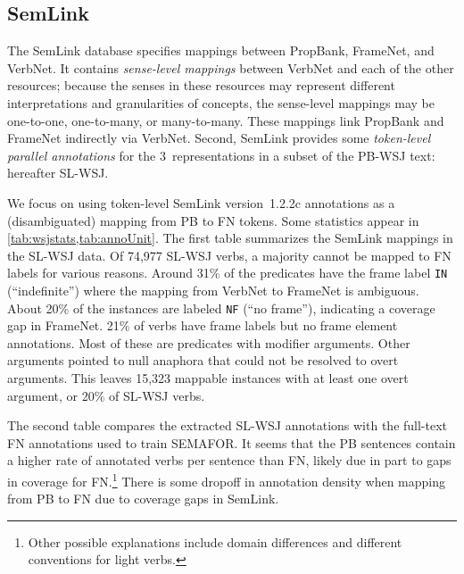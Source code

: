 \documentclass[11pt]{article}
\newcommand{\ensuretext}[1]{#1}
\newcommand{\nssmarker}{\ensuretext{\textcolor{magenta}{\ensuremath{^{\textsc{NS}}_{\textsc{S}}}}}}
\newcommand{\arkcomment}[3]{\ensuretext{\textcolor{#3}{[#1 #2]}}}
\newcommand{\nss}[1]{\arkcomment{\nssmarker}{#1}{magenta}}
\newcommand{\finalversion}[1]{}
\begin{document}
\subsection{SemLink}\label{sec:semlink}

The SemLink database \citep{semlink} specifies mappings between PropBank, FrameNet, and VerbNet. 
It contains \emph{sense-level mappings} between VerbNet and each of the other resources; 
because the senses in these resources may represent different interpretations and granularities of concepts, 
the sense-level mappings may be one-to-one, one-to-many, or many-to-many.
These mappings link PropBank and FrameNet indirectly via VerbNet. %
Second, SemLink provides some \emph{token-level parallel annotations} 
for the 3~representations in a subset of the PB-WSJ text: hereafter SL-WSJ.

We focus on using token-level SemLink version~1.2.2c annotations as a (disambiguated) mapping from PB to FN tokens.
Some statistics appear in \cref{tab:wsjstats,tab:annoUnit}. The first table summarizes the SemLink mappings in the SL-WSJ data. 
Of 74,977 SL-WSJ verbs, a majority cannot be mapped to FN labels for various reasons. 
Around 31\% of the predicates have the frame label \texttt{IN} (``indefinite'') where the mapping from VerbNet to FrameNet is ambiguous. 
About 20\% of the instances are labeled \texttt{NF} (``no frame''), indicating a coverage gap in FrameNet.\finalversion{\nss{did SL annotators attempt to find frames for verbs not in FN?}}
21\% of verbs have frame labels but no frame element annotations. 
Most of these are predicates with modifier arguments. 
Other arguments pointed to null anaphora that could not be resolved to overt arguments.
This leaves 15,323 mappable instances with at least one overt argument, or 20\% of SL-WSJ verbs.

The second table compares the extracted SL-WSJ annotations with the full-text FN annotations used to train SEMAFOR. 
It seems that the PB sentences contain a higher rate of annotated verbs per sentence than FN, 
likely due in part to gaps in coverage for FN.\footnote{Other possible explanations include domain differences and different conventions for light verbs.}
There is some dropoff in annotation density when mapping from PB to FN due to coverage gaps in SemLink.
\end{document}
